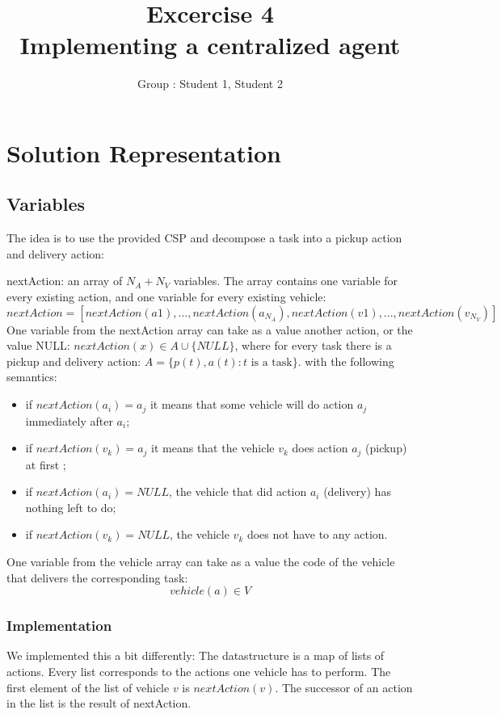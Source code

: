 \documentclass[11pt]{article}
\title{\bf Excercise 4\\ Implementing a centralized agent}
\author{Group \textnumero : Student 1, Student 2}
\begin{document}
\maketitle

\section{Solution Representation}

\subsection{Variables}
The idea is to use the provided CSP and decompose a task into a pickup action and delivery action:

nextAction: 
an array of $N_A +N_V$ variables. 
The array contains one variable	for every existing action, and one variable for every existing vehicle:
$nextAction = [nextAction(a1), . . . , nextAction(a_{N_A}
), nextAction(v1), . . ., nextAction(v_{N_V}
)]$
One variable from the nextAction array can take as a value another action,
or the value NULL:
$nextAction(x) \in A \cup \{NULL\}$, where for every task there is a pickup and delivery action:
$A = \{p(t), a(t) \colon t \text{ is a task}\}$.
with the following semantics:
\begin{itemize}
	\item  if $nextAction(a_i) = a_j$ it means that some vehicle will do action $a_j$ immediately after $a_i$;
	\item  if $nextAction(v_k) = a_j$ it means that the vehicle $v_k$ does action $a_j$ (pickup) at first ;
	\item if $nextAction(a_i) = NULL$, the vehicle that did action $a_i$ (delivery) has nothing left to do;
	\item if $nextAction(v_k) = NULL$, the vehicle $v_k$ does not have to any action.
\end{itemize}

One variable from the vehicle array can take as a value the code of the
vehicle that delivers the corresponding task:
$$ vehicle(a) \in V$$

\subsubsection{Implementation}
We implemented this a bit differently:
The datastructure is a map of lists of actions.
Every list corresponds to the actions one vehicle has to perform.
The first element of the list of vehicle $v$ is $nextAction(v)$.
The successor of an action in the list is the result of nextAction.
\end{document}

